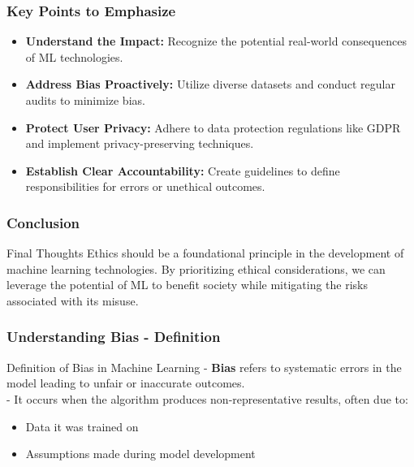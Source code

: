 \documentclass[aspectratio=169]{beamer}
\begin{document}
\begin{frame}[fragile]
    \frametitle{Key Points to Emphasize}
    \begin{itemize}
        \item \textbf{Understand the Impact:} Recognize the potential real-world consequences of ML technologies.
        \item \textbf{Address Bias Proactively:} Utilize diverse datasets and conduct regular audits to minimize bias.
        \item \textbf{Protect User Privacy:} Adhere to data protection regulations like GDPR and implement privacy-preserving techniques.
        \item \textbf{Establish Clear Accountability:} Create guidelines to define responsibilities for errors or unethical outcomes.
    \end{itemize}
\end{frame}

\begin{frame}[fragile]
    \frametitle{Conclusion}
    \begin{block}{Final Thoughts}
        Ethics should be a foundational principle in the development of machine learning technologies. By prioritizing ethical considerations, we can leverage the potential of ML to benefit society while mitigating the risks associated with its misuse.
    \end{block}
\end{frame}

\begin{frame}[fragile]
    \frametitle{Understanding Bias - Definition}
    \begin{block}{Definition of Bias in Machine Learning}
        - \textbf{Bias} refers to systematic errors in the model leading to unfair or inaccurate outcomes.\\
        - It occurs when the algorithm produces non-representative results, often due to:
        \begin{itemize}
            \item Data it was trained on
            \item Assumptions made during model development
        \end{itemize}
    \end{block}
\end{frame}
\end{document}
